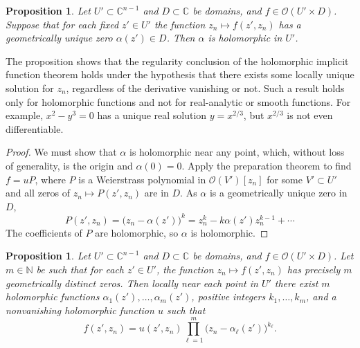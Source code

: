 \documentclass[12pt,openany]{book}
\newcommand{\C}{{\mathbb{C}}}
\newcommand{\N}{{\mathbb{N}}}
\newcommand{\sO}{{\mathscr{O}}}
\theoremstyle{plain}
\newtheorem{prop}[thm]{Proposition}
\theoremstyle{remark}
\theoremstyle{definition}
\theoremstyle{exercise}
\theoremstyle{example}
\begin{document}
\begin{prop} \label{prop:zerohol}
Let
$U' \subset \C^{n-1}$
and
$D \subset \C$
be domains,
and
$f \in \sO(U' \times D)$.
Suppose that for each fixed $z' \in U'$ the function
$z_n \mapsto f(z',z_n)$ has a geometrically unique zero $\alpha(z') \in D$.  Then $\alpha$ is
holomorphic in $U'$.
\end{prop}

The proposition shows that the regularity conclusion of the
holomorphic implicit function theorem holds under the hypothesis that there exists some locally
unique solution for $z_n$, regardless of the derivative vanishing or not.
Such a result holds only for holomorphic
functions and not for real-analytic or smooth functions.  For example, $x^2-y^3 = 0$ has a
unique real solution $y = x^{2/3}$, but $x^{2/3}$ is not even
differentiable.

\begin{proof}
We must show that $\alpha$
is holomorphic near any point, which, without loss
of generality, is the origin and $\alpha(0)=0$.
Apply the preparation
theorem to find $f = u P$,
where $P$ is a
Weierstrass polynomial in $\sO(V')[z_n]$ for some $V' \subset U'$
and all zeros of $z_n \mapsto P(z',z_n)$ are in $D$.
As $\alpha$ is a geometrically unique zero in $D$,
\begin{equation*}
P(z',z_n) = {\bigl(z_n-\alpha(z') \bigr)}^k = z_n^k - k \alpha(z') z_n^{k-1}
+ \cdots
\end{equation*}
The coefficients of $P$ are holomorphic, so $\alpha$ is holomorphic.
\end{proof}

\begin{prop} \label{prop:zeroshol}
Let
$U' \subset \C^{n-1}$
and
$D \subset \C$
be domains,
and
$f \in \sO(U' \times D)$.
Let $m \in \N$ be such that
for each $z' \in U'$, the function $z_n \mapsto f(z',z_n)$ has
precisely $m$ geometrically distinct zeros.
Then locally near each point in $U'$ there exist $m$ holomorphic functions
$\alpha_1(z'),\ldots,\alpha_m(z')$,
positive integers
$k_1,\ldots,k_m$,
and a nonvanishing holomorphic function $u$
such that
\begin{equation*}
f(z',z_n) = u(z',z_n) \prod_{\ell=1}^m {\bigl( z_n - \alpha_\ell(z')
\bigr)}^{k_\ell}
.
\end{equation*}
\end{prop}
\end{document}
